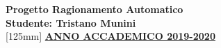 \documentclass{article}
\begin{document}

\begin{titlepage}
 	\centering
  \Huge{\textbf{Progetto Ragionamento Automatico}}\\
 	[30mm]
 	\centering
  \Huge{\textbf{Studente: Tristano Munini}}\\
 	[125mm]
 	\centering
  \LARGE{\underline{\textbf{ANNO ACCADEMICO 2019-2020}}}\\
\end{titlepage}










\end{document}
